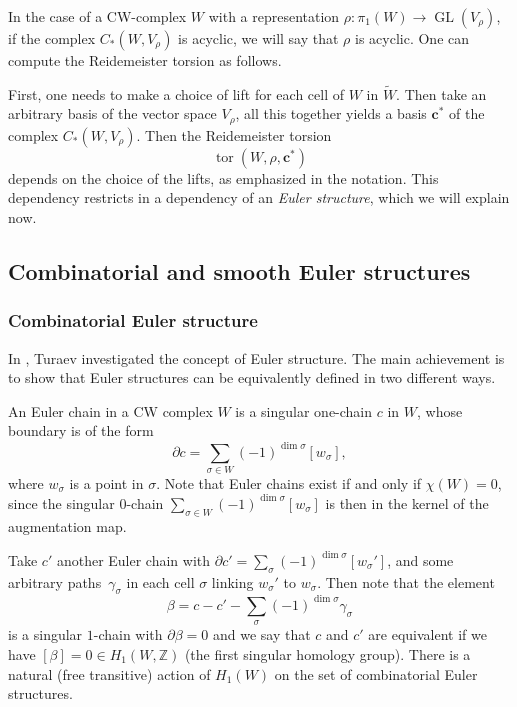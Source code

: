 \documentclass[10pt]{amsart}
\theoremstyle{plain}
\theoremstyle{definition}
\theoremstyle{remark}
\newcommand{\Z}{\mathbb{Z}}
\DeclareMathOperator{\GL}{GL}
\numberwithin{equation}{section}
\DeclareMathOperator{\tor}{tor}
\let\Subsection\subsection\let\Subsubsection\subsubsection
\begin{document}
In the case of a CW-complex $W$ with a representation $\rho \colon \pi_1(W) \to \GL(V_\rho)$, if the complex $C_*(W, V_\rho)$ is acyclic, we will say that $\rho$ is acyclic. One can compute the Reidemeister torsion as follows.\par
First, one needs to make a choice of lift for each cell of $W$ in $\widetilde W$. Then take an arbitrary basis of the vector space $V_\rho$, all this together yields a basis $\boldsymbol c^\ast$ of the complex $C_*(W, V_\rho)$. Then the Reidemeister torsion
\[
\tor(W, \rho, \boldsymbol c^*)
\]
depends on the choice of the lifts, as emphasized in the notation. This dependency restricts in a dependency of an \emph{Euler structure}, which we will explain now.

\Subsection{Combinatorial and smooth Euler structures}
\label{subsec:Euler}
\subsubsection{Combinatorial Euler structure}
In \cite{Turaev}, Turaev investigated the concept of Euler structure. The main achievement is to show that Euler structures can be equivalently defined in two different ways.

An Euler chain in a CW complex $W$ is a singular one-chain $c$ in $W$, whose boundary is of the form
\[
\partial c = \sum_{\sigma \in W} (-1)^{\dim \sigma} [w_\sigma],
\]
where $w_\sigma$ is a point in $\sigma$. Note that Euler chains exist if and only if $\chi(W) = 0$, since the singular $0$-chain $\sum_{\sigma \in W} (-1)^{\dim \sigma} [w_\sigma]$ is then in the kernel of the augmentation map.

Take $c'$ another Euler chain with $\partial c'= \sum_\sigma (-1)^{\dim\sigma}[w_\sigma']$, and some arbitrary paths~$\gamma_\sigma$ in each cell $\sigma$ linking $w_\sigma'$ to $w_\sigma$. Then note that the element
\[
\beta = c - c' - \sum_\sigma(-1)^{\dim\sigma}\gamma_\sigma
\]
is a singular $1$-chain with $\partial\beta = 0$ and we say that $c$ and $c'$ are equivalent if we have $[\beta] = 0 \in H_1(W,\Z)$ (the first singular homology group). There is a natural (free transitive) action of $H_1(W)$ on the set of combinatorial Euler structures.
\end{document}
